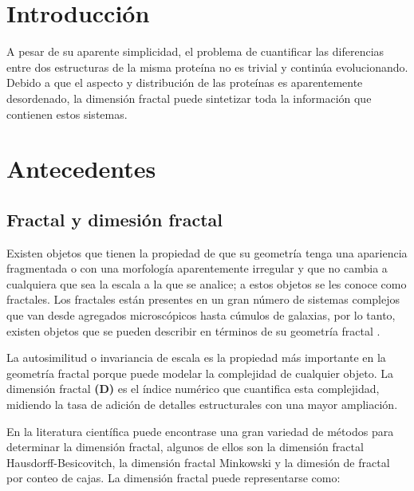 \documentclass[11pt]{article}
\begin{document}
\clearpage

\section{Introducci\'{o}n}

A pesar de su aparente simplicidad, el problema de cuantificar las diferencias entre dos estructuras de la misma prote\'{i}na no es trivial y continúa evolucionando. Debido a que el aspecto y distribuci\'{o}n de las prote\'{i}nas es aparentemente desordenado, la dimensi\'{o}n fractal  puede sintetizar toda la informaci\'{o}n que contienen estos sistemas. 



\section{Antecedentes}

\subsection{Fractal y dimesi\'{o}n fractal}
\label{subsec:subseccion2.1}


Existen objetos que tienen la propiedad de que su geometr\'{i}a tenga una apariencia fragmentada o con una morfolog\'{i}a aparentemente irregular y que no cambia a cualquiera que sea la escala a la que se analice; a estos objetos se les conoce como fractales. Los fractales est\'{a}n presentes en un gran n\'{u}mero de sistemas complejos que van desde agregados microsc\'{o}picos hasta c\'{u}mulos de galaxias, por lo tanto, existen objetos que se pueden describir en t\'{e}rminos de su geometr\'{i}a fractal \cite{Vicsek1992}. 

La autosimilitud o invariancia de escala es la propiedad m\'{a}s importante en la geometr\'{i}a fractal porque puede modelar la complejidad de cualquier objeto. La dimensi\'{o}n fractal \textbf{(D)} es el \'{i}ndice num\'{e}rico que cuantifica esta complejidad, midiendo la tasa de adici\'{o}n de detalles estructurales con una mayor ampliaci\'{o}n.

En la literatura cient\'{i}fica puede encontrase una gran variedad de m\'{e}todos para determinar la dimensi\'{o}n fractal, algunos de ellos son la dimensi\'{o}n fractal Hausdorff-Besicovitch, la dimensi\'{o}n fractal Minkowski y la dimesi\'{o}n de fractal por conteo de cajas. La dimensi\'{o}n fractal puede representarse como:
\end{document}
